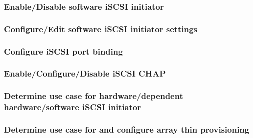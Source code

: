 \subsubsection{Enable/Disable software iSCSI initiator}

\subsubsection{Configure/Edit software iSCSI initiator settings}

\subsubsection{Configure iSCSI port binding}

\subsubsection{Enable/Configure/Disable iSCSI CHAP}

\subsubsection{Determine use case for hardware/dependent hardware/software iSCSI initiator}

\subsubsection{Determine use case for and configure array thin provisioning}
